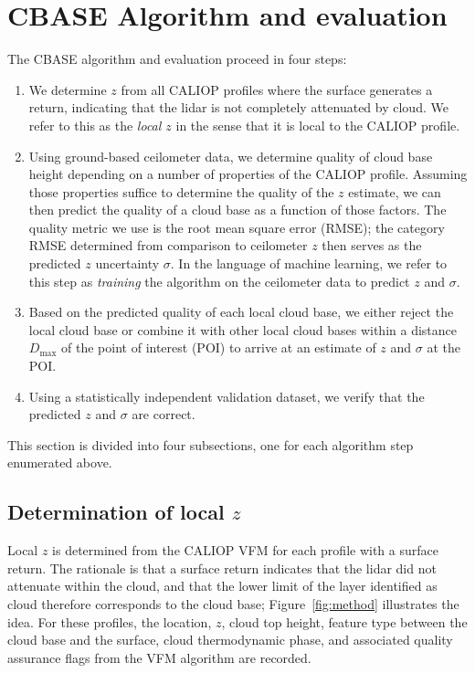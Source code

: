 \documentclass[essd,manuscript]{copernicus}\usepackage[]{graphicx}\usepackage[]{color}
\newcommand\CBH{\ensuremath{z}}
\begin{document}
\section{CBASE Algorithm and evaluation}
\label{sec:algorithm}

The CBASE algorithm and evaluation proceed in four steps:
\begin{enumerate}
\item We determine \CBH{} from all CALIOP profiles where the
  surface generates a return, indicating that the lidar is not completely
  attenuated by cloud.  We refer to this as the \textit{local
    \CBH{}} in the sense that it is local to the CALIOP profile.
\item Using ground-based ceilometer data, we determine quality of cloud base
  height depending on a number of properties of the CALIOP profile.  Assuming
  those properties suffice to determine the quality of the \CBH{} estimate, we
  can then predict the quality of a cloud base as a function of those factors.
  The quality metric we use is the root mean square error (RMSE); the category
  RMSE determined from comparison to ceilometer \CBH{} then serves as the predicted
  \CBH{} uncertainty $\sigma$.  In the language of machine learning, we refer to this step
  as \textit{training} the algorithm on the ceilometer data to predict \CBH{} and
  $\sigma$.
\item Based on the predicted quality of each local cloud base, we either reject
  the local cloud base or combine it with other local cloud bases within a
  distance $D_\text{max}$ of the point of interest (POI) to arrive at an 
  estimate of \CBH{} and $\sigma$ at the POI.
\item Using a statistically independent validation dataset, we verify that the
  predicted \CBH{} and $\sigma$ are correct.
\end{enumerate}

This section is divided into four subsections, one for each algorithm step
enumerated above.

\subsection{Determination of local \CBH{}}
\label{sec:algorithm:local}
Local \CBH{} is determined from the CALIOP VFM for each profile with a surface
return.  The rationale is that a surface return indicates that the lidar did not
attenuate within the cloud, and that the lower limit of the layer identified as
cloud therefore corresponds to the cloud base; Figure~\ref{fig:method}
illustrates the idea.  For these profiles, the location, \CBH{}, cloud top height,
feature type between the cloud base and the surface,
cloud thermodynamic phase, and associated quality assurance flags from the VFM
algorithm are recorded.
\end{document}
